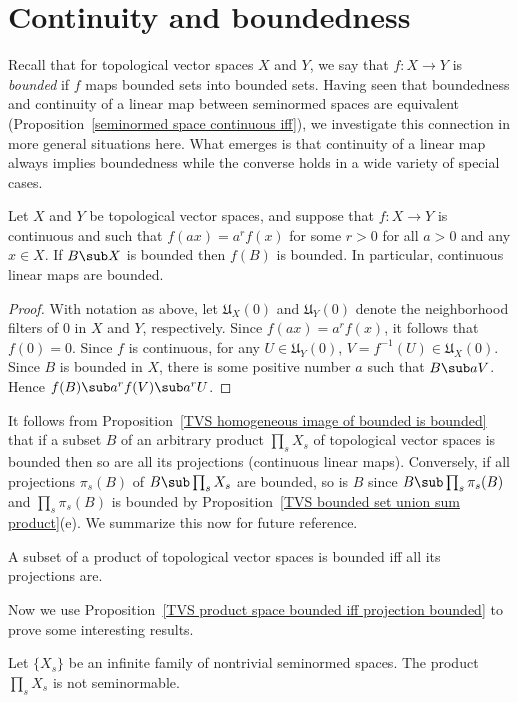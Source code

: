 \section{Continuity and boundedness}
Recall that for topological vector spaces $X$ and $Y$, we say that $f:X\to Y$ is \textit{bounded} if $f$ maps bounded sets into bounded sets. Having seen that boundedness and continuity of a linear map between seminormed spaces are equivalent (Proposition~\ref{seminormed space continuous iff}), we investigate this connection in more general situations here. What emerges is that continuity of a linear map always implies boundedness while the converse holds in a wide variety of special cases.
\begin{proposition}\label{TVS homogeneous image of bounded is bounded}
Let $X$ and $Y$ be topological vector spaces, and suppose that $f:X\to Y$ is continuous and such that $f(ax)=a^rf(x)$ for some $r>0$ for all $a>0$ and any $x\in X$. If $B\sub X$ is bounded then $f(B)$ is bounded. In particular, continuous linear maps are bounded.
\end{proposition}
\begin{proof}
With notation as above, let $\mathfrak{U}_X(0)$ and $\mathfrak{U}_Y(0)$ denote the neighborhood filters of $0$ in $X$ and $Y$, respectively. Since $f(ax)=a^rf(x)$, it follows that $f(0)=0$. Since $f$ is continuous, for any $U\in\mathfrak{U}_Y(0)$, $V=f^{-1}(U)\in\mathfrak{U}_X(0)$. Since $B$ is bounded in $X$, there is some positive number $a$ such that $B\sub aV$. Hence $f(B)\sub a^rf(V)\sub a^rU$.
\end{proof}
It follows from Proposition~\ref{TVS homogeneous image of bounded is bounded} that if a subset $B$ of an arbitrary product $\prod_sX_s$ of topological vector spaces is bounded then so are all its projections (continuous linear maps). Conversely, if all projections $\pi_s(B)$ of $B\sub \prod_sX_s$ are bounded, so is $B$ since $B\sub\prod_s\pi_s(B)$ and $\prod_s\pi_s(B)$ is bounded by Proposition~\ref{TVS bounded set union sum product}(e). We summarize this now for future reference.
\begin{proposition}\label{TVS product space bounded iff projection bounded}
A subset of a product of topological vector spaces is bounded iff all its projections are.
\end{proposition}
Now we use Proposition~\ref{TVS product space bounded iff projection bounded} to prove some interesting results.
\begin{proposition}\label{seminormed space product not seminormable}
Let $\{X_s\}$ be an infinite family of nontrivial seminormed spaces. The product $\prod_sX_s$ is not seminormable.
\end{proposition}
